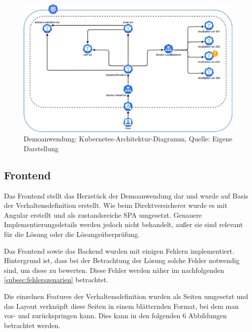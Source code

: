 
\begin{figure}[H]
	\centering
	\includegraphics[width=1.0\linewidth]{img/04_erstellung-poc/demoanwendung_k8s-deployment.png}
	\caption{Demoanwendung: Kubernetes-Architektur-Diagramm, Quelle: Eigene Darstellung}
	\label{fig:demoanwendung_k8s-deployment}
\end{figure}

\subsection{Frontend}

Das Frontend stellt das Herzstück der Demoanwendung dar und wurde auf Basis der Verhaltensdefinition erstellt. Wie beim Direktversicherer wurde es mit Angular erstellt und als zustandsreiche SPA umgesetzt. Genauere Implementierungsdetails werden jedoch nicht behandelt, außer sie sind relevant für die Lösung oder die Lösungsüberprüfung.

Das Frontend sowie das Backend wurden mit einigen Fehlern implementiert. Hintergrund ist, dass bei der Betrachtung der Lösung solche Fehler notwendig sind, um diese zu bewerten. Diese Fehler werden näher im nachfolgenden \autoref{subsec:fehlerszenarien} betrachtet.

Die einzelnen Features der Verhaltensdefinition wurden als Seiten umgesetzt und das Layout verknüpft diese Seiten in einem blätternden Format, bei dem man vor- und zurückspringen kann. Dies kann in den folgenden 6 Abbildungen betrachtet werden.

